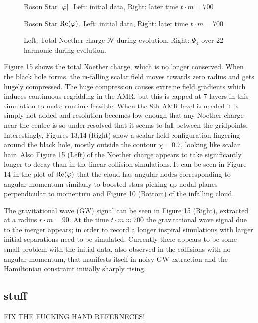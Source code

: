   \begin{figure}[H]
  \caption{Boson Star $|\varphi|$. Left: initial data, Right: later time $t \cdot m = 700$}
  \centering
  \hfill
\end{figure}
  \begin{figure}[H]
  \caption{Boson Star $\Re(\varphi)$. Left: initial data, Right: later time $t \cdot m = 700$}
  \centering
  \hfill
\end{figure}
  \begin{figure}[H]
  \caption{Left: Total Noether charge $\mathcal{N}$ during evolution, Right: $\Psi_4$ over 22 harmonic during evolution.}
  \centering
  \hfill
\end{figure}
Figure 15 shows the total Noether charge, which is no longer conserved. When the black hole forms, the in-falling scalar field moves towards zero radius and gets hugely compressed. The huge compression causes extreme field gradients which induces continuous regridding in the AMR, but this is capped at 7 layers in this simulation to make runtime feasible. When the 8th AMR level is needed it is simply not added and resolution becomes low enough that any Noether charge near the centre is so under-resolved that it seems to fall between the gridpoints. Interestingly, Figures 13,14 (Right) show a scalar field configuration lingering around the black hole, mostly outside the contour $\chi=0.7$, looking like scalar hair. Also Figure 15 (Left) of the Noether charge appears to take significantly longer to decay than in the linear collision simulations. It can be seen in Figure 14 in the plot of $\Re(\varphi)$ that the cloud has angular nodes corresponding to angular momentum similarly to boosted stars picking up nodal planes perpendicular to momentum and Figure 10 (Bottom) of the infalling cloud. 

The gravitational wave (GW) signal can be seen in Figure 15 (Right), extracted at a radius $r \cdot m = 90$. At the time $t \cdot m \approx 700$ the gravitational wave signal due to the merger appears; in order to record a longer inspiral simulations with larger initial separations need to be simulated. Currently there appears to be some small problem with the initial data, also observed in the collisions with no angular momentum, that manifests itself in noisy GW extraction and the Hamiltonian constraint initially sharply rising. 



\subsection{stuff}
FIX THE FUCKING HAND REFERNECES!

